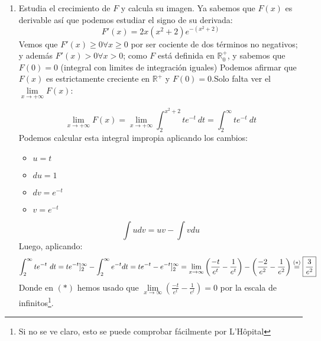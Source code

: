 \documentclass[12pt]{article}
\begin{document}
\begin{ejercicio}
\begin{enumerate}[label=\alph*)]
            \item Estudia el crecimiento de $F$ y calcula su imagen.
            \newline
            Ya sabemos que $F(x)$ es derivable así que podemos estudiar el signo de su derivada:
            $$F'(x) = 2x(x^2+2)e^{-(x^2+2)}$$
            Vemos que $F'(x)\geq 0 \forall x \geq 0 $ por ser cociente de dos términos no negativos; y además $F'(x) > 0 \forall x >0$; como $F$ está definida en $\mathbb{R}_0^+$, y sabemos que $F(0) = 0$ (integral con limites de integración iguales) Podemos afirmar que $F(x)$ es estrictamente creciente en $\mathbb{R}^+$ y $F(0)=0$.\newline Solo falta ver el $\lim\limits_{x\to+\infty} F(x)$:

            $$\lim\limits_{x\to+\infty} F(x) = \lim\limits_{x\to+\infty} \int_{2}^{x^2+2} te^{-t}~dt = \int_{2}^{\infty} te^{-t}~dt$$
            Podemos calcular esta integral impropia aplicando los cambios:
            \begin{itemize}
                \item $u=t$
                \item $du=1$
                \item $dv=e^{-t}$
                \item $v=e^{-t}$
            \end{itemize}
            $$\int udv = uv-\int vdu$$
            Luego, aplicando:
            $$\int_{2}^{\infty} te^{-t}~dt = te^{-t}]_2^\infty - \int_{2}^{\infty} e^{-t}dt =te^{-t}-e^{-t}]_2^\infty =\lim\limits_{x\to\infty}\left(\frac{-t}{e^t}-\frac1{e^t}\right)-\left(\frac{-2}{e^2}-\frac1{e^2}\right) \stackrel{(\ast)}{=} \boxed{\frac{3}{e^2}}$$
            Donde en $(\ast)$ hemos usado que $\lim\limits_{x\to\infty}(\frac{-t}{e^t}-\frac1{e^t}) = 0$ por la escala de infinitos\footnote{Si no se ve claro, esto se puede comprobar fácilmente por L'Hôpital}.\\
            \centering\fbox{En conclusión $Im(F) = [0,\frac{3}{e^2}[$}
                        
        \end{enumerate}
    \end{ejercicio}

    
\end{document}

